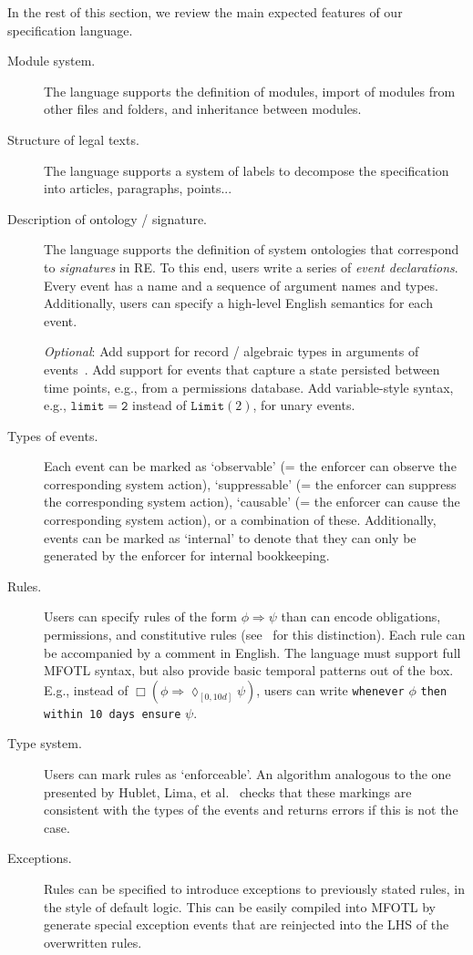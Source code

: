 \documentclass{proposal}
\begin{document}
In the rest of this section, we review the main expected features of our specification language.
\begin{description}
\item[Module system.] {\color{green} The language supports the definition of modules, import of modules from other files and folders,} and inheritance between modules.
\item[Structure of legal texts.] {\color{green} The language supports a system of labels to decompose the specification into articles, paragraphs, points...}
\item[Description of ontology / signature.] {\color{green} The language supports the definition of system ontologies that correspond to \emph{signatures} in RE. To this end, users write a series of \emph{event declarations}. Every event has a name and a sequence of argument names and types. Additionally, users can specify a high-level English semantics for each event.}

\emph{Optional}: Add support for record / algebraic types in arguments of events~\cite{LimaGraf2023}. {\color{green} Add support for events that capture a state persisted between time points, e.g., from a permissions database. Add variable-style syntax, e.g., $\mathtt{limit=2}$ instead of $\mathtt{Limit}(2)$, for unary events.}
\item[Types of events.] {\color{green} Each event can be marked as `observable' (= the enforcer can observe the corresponding system action), `suppressable' (= the enforcer can suppress the corresponding system action), `causable' (= the enforcer can cause the corresponding system action), or a combination of these. Additionally, events can be marked as `internal' to denote that they can only be generated by the enforcer for internal bookkeeping.}
\item[Rules.] {\color{green} Users can specify rules of the form $\phi \Longrightarrow \psi$ than can encode obligations, permissions, and constitutive rules (see~\cite{Robaldo2020} for this distinction). Each rule can be accompanied by a comment in English. The language must support full MFOTL syntax, but also provide basic temporal patterns out of the box. E.g., instead of $\Box (\phi \Longrightarrow \lozenge_{[0,10d]} \psi)$, users can write \texttt{whenever} $\phi$ \texttt{then within 10 days ensure} $\psi$.}
\item[Type system.] {\color{green} Users can mark rules as `enforceable'.} An algorithm analogous to the one presented by Hublet, Lima, et al.~\cite{Hublet2024} checks that these markings are consistent with the types of the events and returns errors if this is not the case.
\item[Exceptions.] {\color{green} Rules can be specified to introduce exceptions to previously stated rules, in the style of default logic. This can be easily compiled into MFOTL by generate special exception events that are reinjected into the LHS of the overwritten rules.}


\end{description}
\end{document}
